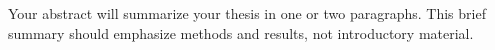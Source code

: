 

Your abstract will summarize your thesis in one or two paragraphs.  This brief summary should emphasize methods and results, not introductory material.